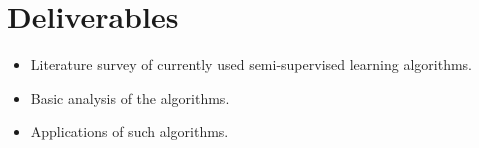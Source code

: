\documentclass[12pt,a4paper,twocolumn]{article}
\begin{document}
\section*{Deliverables}
\begin{itemize}
\item Literature survey of currently used semi-supervised learning algorithms.
\item Basic analysis of the algorithms.
\item Applications of such algorithms.
\end{itemize}
\end{document}
